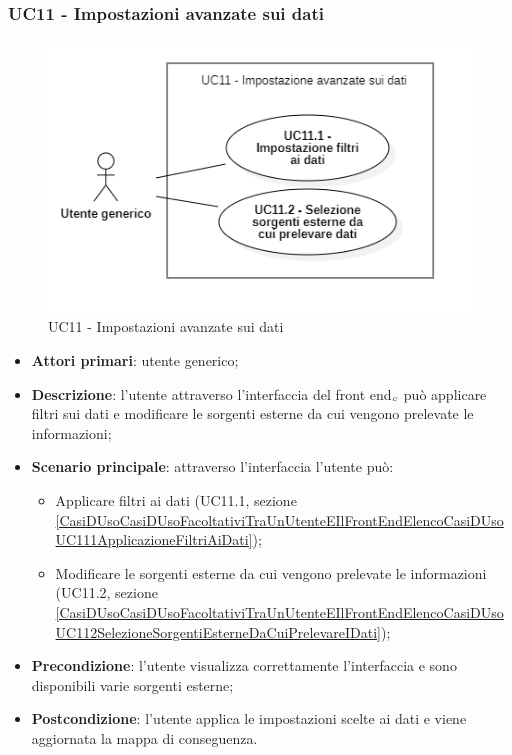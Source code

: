 \subsubsection{UC11 - Impostazioni avanzate sui dati}\label{CasiDUsoCasiDUsoFacoltativiTraUnUtenteEIlFrontEndElencoCasiDUsoUC11ImpostazioniAvanzateSuiDati}

\begin{center}
	\begin{figure}[H]
		\centering\includegraphics[scale=0.7]{../immagini/attori_casi/UC11_1.png}
		\caption{UC11 - Impostazioni avanzate sui dati}
	\end{figure}
\end{center}

\begin{itemize}
	\item \textbf{Attori primari}: utente generico;
	\item \textbf{Descrizione}: l'utente attraverso l'interfaccia del front end$_{\scaleto{G}{3pt}}$ può applicare filtri sui dati e modificare le sorgenti esterne da cui vengono prelevate le informazioni;
	\item \textbf{Scenario principale}: attraverso l'interfaccia l'utente può:
	\begin{itemize}
		\item Applicare filtri ai dati (UC11.1, sezione  \ref{CasiDUsoCasiDUsoFacoltativiTraUnUtenteEIlFrontEndElencoCasiDUsoUC111ApplicazioneFiltriAiDati});
		\item Modificare le sorgenti esterne da cui vengono prelevate le informazioni (UC11.2, sezione \ref{CasiDUsoCasiDUsoFacoltativiTraUnUtenteEIlFrontEndElencoCasiDUsoUC112SelezioneSorgentiEsterneDaCuiPrelevareIDati});
	\end{itemize}
	\item \textbf{Precondizione}: l'utente visualizza correttamente l'interfaccia e sono disponibili varie sorgenti esterne;
	\item \textbf{Postcondizione}: l'utente applica le impostazioni scelte ai dati e viene aggiornata la mappa di conseguenza.
\end{itemize}

